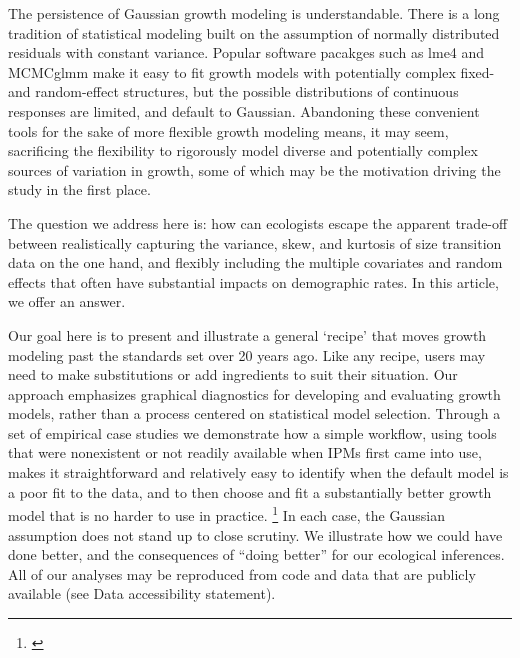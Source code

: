 \documentclass[12pt]{article}
\newcommand{\tom}[2]{{\color{red}{#1}}\footnote{\textit{\color{red}{#2}}}}
\begin{document}
The persistence of Gaussian growth modeling is understandable. 
There is a long tradition of statistical modeling built on the assumption of normally distributed residuals with constant variance.
Popular software pacakges such as lme4 \citep{bates2007lme4} and MCMCglmm \citep{hadfield2010mcmc} make it easy to fit growth models with potentially complex fixed- and random-effect structures, but the possible distributions of continuous responses are limited, and default to Gaussian.
Abandoning these convenient tools for the sake of more flexible growth modeling means, it may seem, sacrificing the flexibility to rigorously model diverse and potentially complex sources of variation in growth, some of which may be the motivation driving the study in the first place.

The question we address here is: how can ecologists escape the apparent trade-off between realistically capturing the variance, skew, and kurtosis of size transition data on the one hand, and flexibly including the multiple covariates and random effects that often have substantial impacts on demographic rates.  
In this article, we offer an answer. 

Our goal here is to present and illustrate a general `recipe' that moves growth modeling past the standards set over 20 years ago.
Like any recipe, users may need to make substitutions or add ingredients to suit their situation. 
Our approach emphasizes graphical diagnostics for developing and evaluating growth models, rather than a process centered on statistical model selection. 
Through a set of empirical case studies we demonstrate how a simple workflow, using tools that were nonexistent or not readily available when IPMs first came into use, makes it straightforward and relatively easy to identify when the default model is a poor fit to the data, and to then choose and fit a substantially better growth model that is no harder to use in practice. 
\tom{We illustrate our approach by revisiting four of our own, mostly published IPM analyses that assumed Gaussian growth.}{Need to commit to case study choices - Steve wanted to include corals for contrast with Peterson et al.} 
In each case, the Gaussian assumption does not stand up to close scrutiny. 
We illustrate how we could have done better, and the consequences of ``doing better'' 
for our ecological inferences. 
All of our analyses may be reproduced from code and data that are publicly available (see Data accessibility statement).
\end{document}
